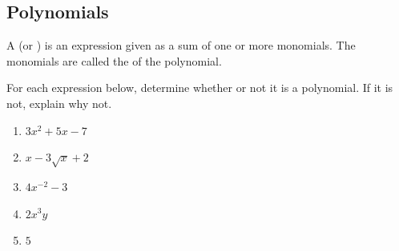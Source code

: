 \subsection{Polynomials} 
\begin{definition}[Polynomial]
A  (or ) is an expression given as a sum of one or more monomials. The monomials are called the  of the polynomial.
\end{definition}
\begin{Example}
For each expression below, determine whether or not it is a polynomial. If it is not, explain why not.
\begin{enumerate}\setabc
\item $3x^2+5x-7$\makeblanknewf
\item $x-3\sqrt{x}+2$\makeblanknewf
\item $4x^{-2}-3$\makeblanknewf
\item $2x^3y$\makeblanknewf
\item $5$\makeblanknewf
\end{enumerate}
\end{Example}